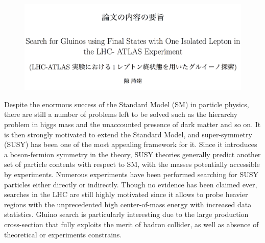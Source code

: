 \documentclass {article}
\begin{document}



\begin{figure}[H]
\centering
\includegraphics[width=160mm]{figures/title.pdf}
\captionsetup{labelformat=empty}
\caption{}
\end{figure}

Despite the enormous success of the Standard Model (SM) in particle physics, there are still a number of problems left to be solved such as the hierarchy problem in higgs mass and the unaccounted presence of dark matter and so on.
It is then strongly motivated to extend the Standard Model, and super-symmetry (SUSY) has been one of the most appealing framework for it.
Since it introduces a boson-fermion symmetry in the theory, SUSY theories generally predict another set of particle contents with respect to SM, with the masses potentially accessible by experiments.
Numerous experiments have been performed searching for SUSY particles either directly or indirectly.
Though no evidence has been claimed ever, searches in the LHC are still highly motivated since it allows to probe heavier regions with the unprecedented high center-of-mass energy with increased data statistics.
Gluino search is particularly interesting due to the large production cross-section that fully exploits the merit of hadron collider, as well as absence of theoretical or experiments constrains. \\
\end{document}
